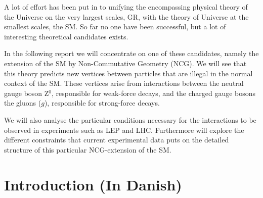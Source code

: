A lot of effort has been put in to unifying the encompassing physical theory of the Universe on the very largest scales, GR, with the theory of Universe at the smallest scales, the SM. So far no one have been successful, but a lot of interesting theoretical candidates exists.

In the following report we will concentrate on one of these candidates, namely the extension of the SM by Non-Commutative Geometry (NCG). We will see that this theory predicts new vertices between particles that are illegal in the normal context of the SM. These vertices arise from interactions between the neutral gauge boson Z$^0$, responsible for weak-force decays, and the charged gauge bosons the gluons ($g$), responsible for strong-force decays.

We will also analyse the particular conditions necessary for the interactions to be observed in experiments such as LEP and LHC. Furthermore will explore the different constraints that current experimental data puts on the detailed structure of this particular NCG-extension of the SM.


\section{Introduction (In Danish)}